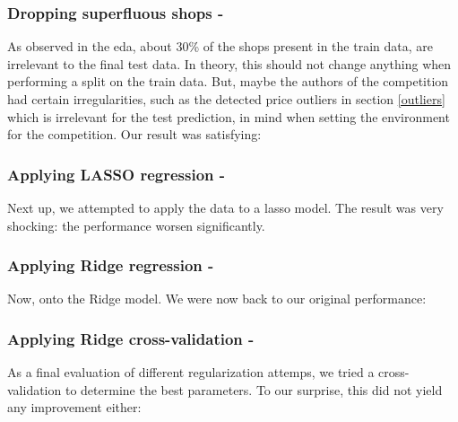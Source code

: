 \subsubsection{Dropping superfluous shops - }

As observed in the \Acrshort{eda}, about 30\% of the shops present in the train data, are irrelevant to the final test data. In theory, this should not change anything when performing a split on the train data. But, maybe the authors of the competition had certain irregularities, such as the detected price outliers in section \ref{outliers} which is irrelevant for the test prediction, in mind when setting the environment for the competition. Our result was satisfying:

\subsubsection{Applying LASSO regression - }

Next up, we attempted to apply the data to a \acrshort{lasso} model. The result was very shocking: the performance worsen significantly.

\subsubsection{Applying Ridge regression - }

Now, onto the Ridge model. We were now back to our original performance:


\subsubsection{Applying Ridge cross-validation - }

As a final evaluation of different regularization attemps, we tried a cross-validation to determine the best parameters. To our surprise, this did not yield any improvement either:

